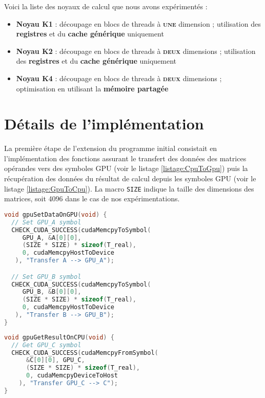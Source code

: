 \documentclass[11pt, twocolumn]{article}
\begin{document}
\par Voici la liste des noyaux de calcul que nous avons expérimentés :

\begin{itemize}
    \item \textbf{Noyau K1} : découpage en blocs de threads à \textbf{\textsc{une}} dimension ; utilisation des \textbf{registres} et du \textbf{cache générique} uniquement
    \item \textbf{Noyau K2} : découpage en blocs de threads à \textbf{\textsc{deux}} dimensions ; utilisation des \textbf{registres} et du \textbf{cache générique} uniquement
    \item \textbf{Noyau K4} : découpage en blocs de threads à \textbf{\textsc{deux}} dimensions ; optimisation en utilisant la \textbf{mémoire partagée}
\end{itemize}

\section{Détails de l'implémentation}

La première étape de l'extension du programme initial consistait en l'implémentation des fonctions assurant le transfert des données des matrices opérandes vers des symboles GPU (voir le listage \ref{listage:CpuToGpu}) puis la récupération des données du résultat de calcul depuis les symboles GPU (voir le listage \ref{listage:GpuToCpu}). La macro \texttt{SIZE} indique la taille des dimensions des matrices, soit 4096 dans le cas de nos expérimentations. 

\begin{lstlisting}[language=C, label={listage:CpuToGpu}, caption={Fonction de transfert de données vers GPU}]
void gpuSetDataOnGPU(void) {
  // Set GPU_A symbol
  CHECK_CUDA_SUCCESS(cudaMemcpyToSymbol(
     GPU_A, &A[0][0],
     (SIZE * SIZE) * sizeof(T_real),
     0, cudaMemcpyHostToDevice
   ), "Transfer A --> GPU_A");

  // Set GPU_B symbol
  CHECK_CUDA_SUCCESS(cudaMemcpyToSymbol(
     GPU_B, &B[0][0],
     (SIZE * SIZE) * sizeof(T_real),
     0, cudaMemcpyHostToDevice
   ), "Transfer B --> GPU_B");
}
\end{lstlisting}

\begin{lstlisting}[language=C, label={listage:GpuToCpu}, caption={Fonction de transfert de données depuis GPU}]
void gpuGetResultOnCPU(void) {
  // Get GPU_C symbol
  CHECK_CUDA_SUCCESS(cudaMemcpyFromSymbol(
      &C[0][0], GPU_C,
      (SIZE * SIZE) * sizeof(T_real),
      0, cudaMemcpyDeviceToHost
    ), "Transfer GPU_C --> C");
}
\end{lstlisting}
\end{document}
